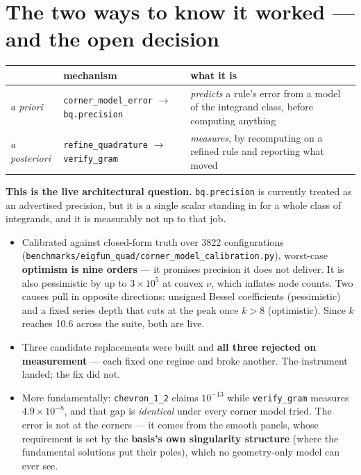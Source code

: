 \documentclass[11pt]{article}
\newcommand{\code}[1]{\texttt{#1}}
\begin{document}
\section{The two ways to know it worked --- and the open decision}

\begin{center}\small
\begin{tabularx}{\textwidth}{@{}l l L@{}}
\toprule
 & \textbf{mechanism} & \textbf{what it is} \\
\midrule
\emph{a priori} & \code{corner\_model\_error} $\to$ \code{bq.precision} &
  \emph{predicts} a rule's error from a model of the integrand class, before
  computing anything \\
\emph{a posteriori} & \code{refine\_quadrature} $\to$ \code{verify\_gram} &
  \emph{measures}, by recomputing on a refined rule and reporting what moved \\
\bottomrule
\end{tabularx}
\end{center}

\noindent
\textbf{This is the live architectural question.} \code{bq.precision} is
currently treated as an advertised precision, but it is a single scalar standing
in for a whole class of integrands, and it is measurably not up to that job.

\begin{itemize}
\item Calibrated against closed-form truth over 3822 configurations
  (\code{benchmarks/eigfun\_quad/corner\_model\_calibration.py}), worst-case
  \textbf{optimism is nine orders} --- it promises precision it does not deliver.
  It is also pessimistic by up to $3\!\times\!10^5$ at convex $\nu$, which
  inflates node counts. Two causes pull in opposite directions: unsigned Bessel
  coefficients (pessimistic) and a fixed series depth that cuts at the peak once
  $k > 8$ (optimistic). Since $k$ reaches 10.6 across the suite, both are live.
\item Three candidate replacements were built and \textbf{all three rejected on
  measurement} --- each fixed one regime and broke another. The instrument
  landed; the fix did not.
\item More fundamentally: \code{chevron\_1\_2} claims $10^{-13}$ while
  \code{verify\_gram} measures $4.9\!\times\!10^{-8}$, and that gap is
  \emph{identical} under every corner model tried. The error is not at the
  corners --- it comes from the smooth panels, whose requirement is set by the
  \textbf{basis's own singularity structure} (where the fundamental solutions put
  their poles), which no geometry-only model can ever see.
\end{itemize}
\end{document}
